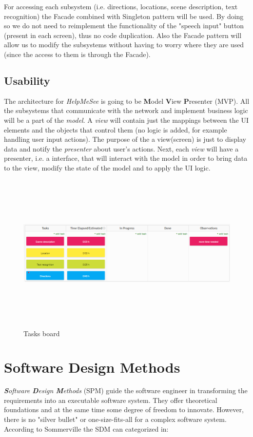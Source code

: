 \documentclass{article}[11]
\begin{document}
	For accessing each subsystem (i.e. directions, locations, scene description, text recognition) the Facade combined with Singleton pattern will be used. By doing so we do not need to reimplement the functionality of the "speech input" button (present in each screen), thus no code duplication. Also the Facade pattern will allow us to modify the subsystems without having to worry where they are used (since the access to them is through the Facade).
	
\subsection{Usability}
	The architecture for \emph{HelpMeSee} is going to be \textbf{M}odel \textbf{V}iew \textbf{P}resenter (MVP). All the subsystems that communicate with the network and implement business logic will be a part of the \emph{model}. A \emph{view} will contain just the mappings between the UI elements and the objects that control them (no logic is added, for example handling user input actions). The purpose of the a view(screen) is just to display data and notify the \emph{presenter} about user's actions. Next, each \emph{view} will have a presenter, i.e. a interface, that will interact with the model in order to bring data to the view, modify the state of the model and to apply the UI logic.

 
\begin{figure}[H] 
	\includegraphics[width=16.5cm,height=8cm]{./imgs/taskSched}
	\caption{Tasks board}
\end{figure}

\section{Software Design Methods}
	\emph{\textbf{S}oftware \textbf{D}esign \textbf{M}ethods} (SPM) guide the software engineer in transforming the requirements into an executable software system. They offer theoretical foundations and at the same time some degree of freedom to innovate. However, there is no "silver bullet" \cite{brooks1987no} or one-size-fits-all for a complex software system.
According to Sommerville\cite{sommerville2010software} the \ac{SDM} can categorized in:
\end{document}
